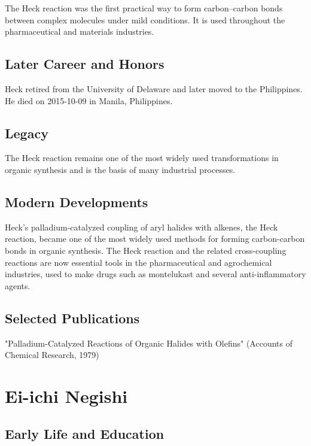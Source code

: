 The Heck reaction was the first practical way to form carbon--carbon bonds between complex molecules under mild conditions. It is used throughout the pharmaceutical and materials industries.

\subsection*{Later Career and Honors}

Heck retired from the University of Delaware and later moved to the Philippines. He died on 2015-10-09 in Manila, Philippines.

\subsection*{Legacy}

The Heck reaction remains one of the most widely used transformations in organic synthesis and is the basis of many industrial processes.

\subsection*{Modern Developments}

Heck's palladium-catalyzed coupling of aryl halides with alkenes, the Heck reaction, became one of the most widely used methods for forming carbon-carbon bonds in organic synthesis. The Heck reaction and the related cross-coupling reactions are now essential tools in the pharmaceutical and agrochemical industries, used to make drugs such as montelukast and several anti-inflammatory agents.

\subsection*{Selected Publications}

"Palladium-Catalyzed Reactions of Organic Halides with Olefins" (Accounts of Chemical Research, 1979)

\clearpage

\section{Ei-ichi Negishi}

\subsection*{Early Life and Education}


